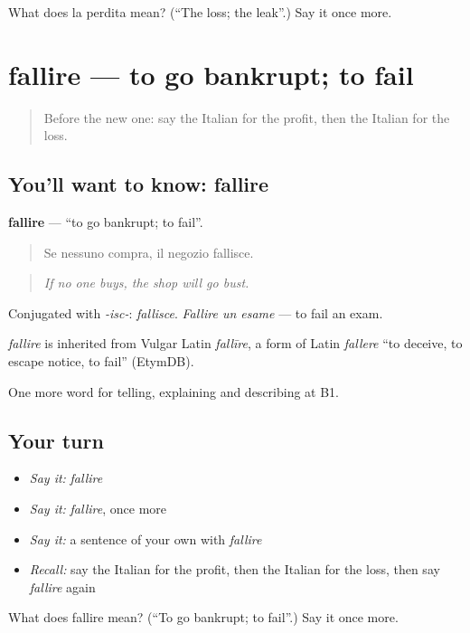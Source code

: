 \begin{tcolorbox}[breakable,colback=teal!4,colframe=teal!35!black,title={Before you move on}]
What does la perdita mean? (\textquotedblleft{}The loss; the leak\textquotedblright{}.) Say it once more.
\end{tcolorbox}
\section[fallire]{fallire — to go bankrupt; to fail}

\label{lesson:IT-C398-fallire}



\begin{quote}
Before the new one: say the Italian for the profit, then the Italian for the loss.
\end{quote}

\subsection*{You'll want to know: fallire}
\textbf{fallire} — \textquotedblleft{}to go bankrupt; to fail\textquotedblright{}.

\begin{quote}
Se nessuno compra, il negozio fallisce.
\end{quote}

\begin{quote}
\emph{If no one buys, the shop will go bust.}
\end{quote}

Conjugated with \emph{-isc-}: \emph{fallisce}. \emph{Fallire un esame} — to fail an exam.

\begin{cousinweb}
\emph{fallire} is inherited from Vulgar Latin \emph{fallīre}, a form of Latin \emph{fallere} \textquotedblleft{}to deceive, to escape notice, to fail\textquotedblright{} (EtymDB).
\end{cousinweb}

\begin{grammarlens}[title={What you've built}]
One more word for telling, explaining and describing at B1.
\end{grammarlens}

\subsection*{Your turn}
\begin{itemize}
\raggedright
  \item \emph{Say it:} \emph{fallire}
  \item \emph{Say it:} \emph{fallire}, once more
  \item \emph{Say it:} a sentence of your own with \emph{fallire}
  \item \emph{Recall:} say the Italian for the profit, then the Italian for the loss, then say \emph{fallire} again
\end{itemize}

\begin{tcolorbox}[breakable,colback=teal!4,colframe=teal!35!black,title={Before you move on}]
What does fallire mean? (\textquotedblleft{}To go bankrupt; to fail\textquotedblright{}.) Say it once more.
\end{tcolorbox}
